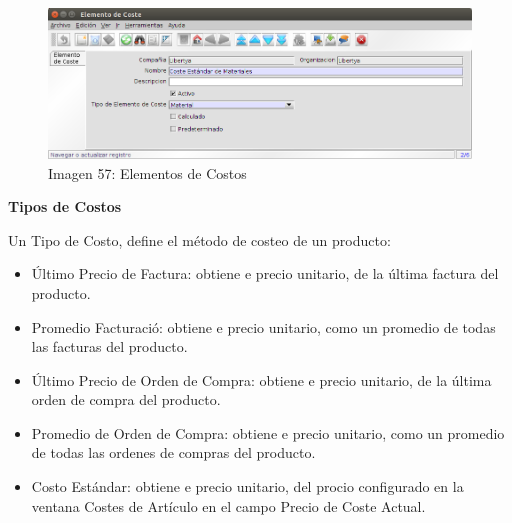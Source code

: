 \documentclass[letterpaper,10pt,spanish]{sphinxmanual}
\begin{document}
\begin{figure}[htbp]
\centering
\capstart

\includegraphics{ly_elemcosto.png}
\caption{Imagen 57: Elementos de Costos}\end{figure}

\textbf{Tipos de Costos}

Un Tipo de Costo, define el método de costeo de un producto:
\begin{itemize}
\item {} 
Último Precio de Factura: obtiene e precio unitario, de la última factura del producto.

\item {} 
Promedio Facturació: obtiene e precio unitario, como un promedio de todas las facturas del producto.

\item {} 
Último Precio de Orden de Compra: obtiene e precio unitario, de la última orden de compra del producto.

\item {} 
Promedio de Orden de Compra: obtiene e precio unitario, como un promedio de todas las ordenes de compras del producto.

\item {} 
Costo Estándar: obtiene e precio unitario, del procio configurado en la ventana Costes de Artículo en el campo Precio de Coste Actual.

\end{itemize}
\end{document}
